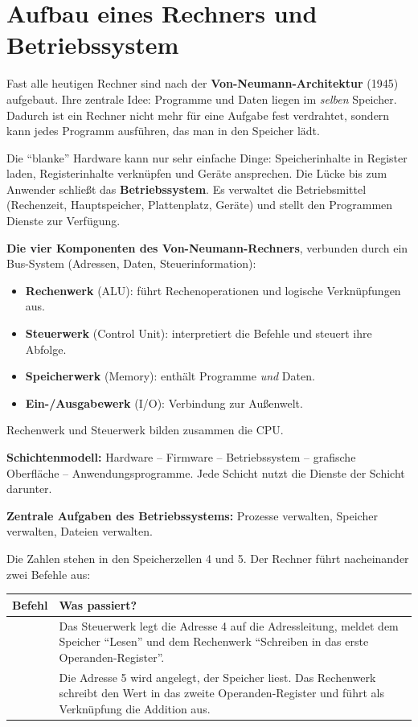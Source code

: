 \section{Aufbau eines Rechners und Betriebssystem}
\worum
Fast alle heutigen Rechner sind nach der \textbf{Von-Neumann-Architektur} (1945) aufgebaut. Ihre zentrale Idee: Programme und Daten liegen im \emph{selben} Speicher. Dadurch ist ein Rechner nicht mehr für eine Aufgabe fest verdrahtet, sondern kann jedes Programm ausführen, das man in den Speicher lädt.

Die \enquote{blanke} Hardware kann nur sehr einfache Dinge: Speicherinhalte in Register laden, Registerinhalte verknüpfen und Geräte ansprechen. Die Lücke bis zum Anwender schließt das \textbf{Betriebssystem}. Es verwaltet die Betriebsmittel (Rechenzeit, Hauptspeicher, Plattenplatz, Geräte) und stellt den Programmen Dienste zur Verfügung.

\begin{merke}
\textbf{Die vier Komponenten des Von-Neumann-Rechners}, verbunden durch ein Bus-System (Adressen, Daten, Steuerinformation):
\begin{itemize}[itemsep=0.1em]
\item \textbf{Rechenwerk} (ALU): führt Rechenoperationen und logische Verknüpfungen aus.
\item \textbf{Steuerwerk} (Control Unit): interpretiert die Befehle und steuert ihre Abfolge.
\item \textbf{Speicherwerk} (Memory): enthält Programme \emph{und} Daten.
\item \textbf{Ein-/Ausgabewerk} (I/O): Verbindung zur Außenwelt.
\end{itemize}
Rechenwerk und Steuerwerk bilden zusammen die CPU.

\smallskip
\textbf{Schichtenmodell:} Hardware -- Firmware -- Betriebssystem -- grafische Oberfläche -- Anwendungsprogramme. Jede Schicht nutzt die Dienste der Schicht darunter.

\smallskip
\textbf{Zentrale Aufgaben des Betriebssystems:} Prozesse verwalten, Speicher verwalten, Dateien verwalten.
\end{merke}

\beispiele
{}
Die Zahlen stehen in den Speicherzellen 4 und 5. Der Rechner führt nacheinander zwei Befehle aus:
\begin{center}
\begin{tabular}{@{}lL{11.5cm}@{}}
\toprule
\textbf{Befehl} & \textbf{Was passiert?} \\
\midrule
{} & Das Steuerwerk legt die Adresse 4 auf die Adressleitung, meldet dem Speicher \enquote{Lesen} und dem Rechenwerk \enquote{Schreiben in das erste Operanden-Register}. \\
 & Die Adresse 5 wird angelegt, der Speicher liest. Das Rechenwerk schreibt den Wert in das zweite Operanden-Register und führt als Verknüpfung die Addition aus. \\
\bottomrule
\end{tabular}
\end{center}

